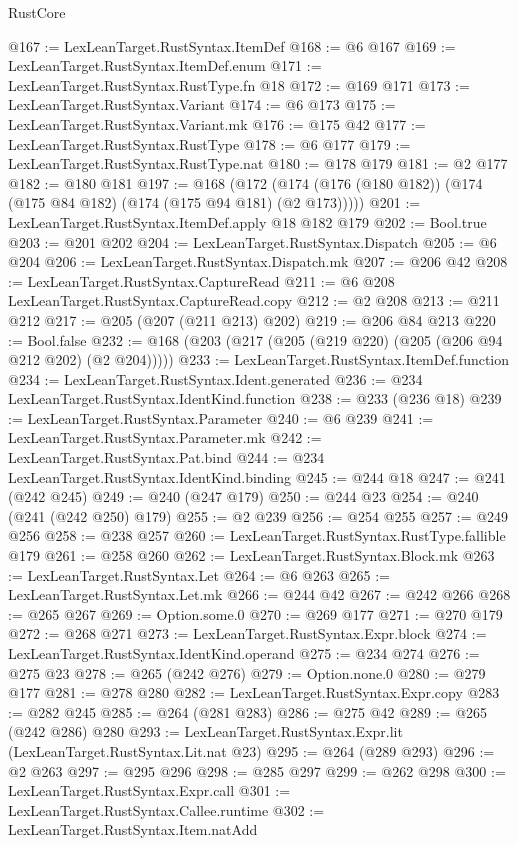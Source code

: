 \begin{lexlean}{RustCore}
\begin{coremodule}
@167 := LexLeanTarget.RustSyntax.ItemDef
@168 := @6 @167
@169 := LexLeanTarget.RustSyntax.ItemDef.enum
@171 := LexLeanTarget.RustSyntax.RustType.fn @18
@172 := @169 @171
@173 := LexLeanTarget.RustSyntax.Variant
@174 := @6 @173
@175 := LexLeanTarget.RustSyntax.Variant.mk
@176 := @175 @42
@177 := LexLeanTarget.RustSyntax.RustType
@178 := @6 @177
@179 := LexLeanTarget.RustSyntax.RustType.nat
@180 := @178 @179
@181 := @2 @177
@182 := @180 @181
@197 := @168
    (@172 (@174 (@176 (@180 @182)) (@174 (@175 @84 @182) (@174 (@175 @94 @181) (@2 @173)))))
@201 := LexLeanTarget.RustSyntax.ItemDef.apply @18 @182 @179
@202 := Bool.true
@203 := @201 @202
@204 := LexLeanTarget.RustSyntax.Dispatch
@205 := @6 @204
@206 := LexLeanTarget.RustSyntax.Dispatch.mk
@207 := @206 @42
@208 := LexLeanTarget.RustSyntax.CaptureRead
@211 := @6 @208 LexLeanTarget.RustSyntax.CaptureRead.copy
@212 := @2 @208
@213 := @211 @212
@217 := @205 (@207 (@211 @213) @202)
@219 := @206 @84 @213
@220 := Bool.false
@232 := @168 (@203 (@217 (@205 (@219 @220) (@205 (@206 @94 @212 @202) (@2 @204)))))
@233 := LexLeanTarget.RustSyntax.ItemDef.function
@234 := LexLeanTarget.RustSyntax.Ident.generated
@236 := @234 LexLeanTarget.RustSyntax.IdentKind.function
@238 := @233 (@236 @18)
@239 := LexLeanTarget.RustSyntax.Parameter
@240 := @6 @239
@241 := LexLeanTarget.RustSyntax.Parameter.mk
@242 := LexLeanTarget.RustSyntax.Pat.bind
@244 := @234 LexLeanTarget.RustSyntax.IdentKind.binding
@245 := @244 @18
@247 := @241 (@242 @245)
@249 := @240 (@247 @179)
@250 := @244 @23
@254 := @240 (@241 (@242 @250) @179)
@255 := @2 @239
@256 := @254 @255
@257 := @249 @256
@258 := @238 @257
@260 := LexLeanTarget.RustSyntax.RustType.fallible @179
@261 := @258 @260
@262 := LexLeanTarget.RustSyntax.Block.mk
@263 := LexLeanTarget.RustSyntax.Let
@264 := @6 @263
@265 := LexLeanTarget.RustSyntax.Let.mk
@266 := @244 @42
@267 := @242 @266
@268 := @265 @267
@269 := Option.some.{0}
@270 := @269 @177
@271 := @270 @179
@272 := @268 @271
@273 := LexLeanTarget.RustSyntax.Expr.block
@274 := LexLeanTarget.RustSyntax.IdentKind.operand
@275 := @234 @274
@276 := @275 @23
@278 := @265 (@242 @276)
@279 := Option.none.{0}
@280 := @279 @177
@281 := @278 @280
@282 := LexLeanTarget.RustSyntax.Expr.copy
@283 := @282 @245
@285 := @264 (@281 @283)
@286 := @275 @42
@289 := @265 (@242 @286) @280
@293 := LexLeanTarget.RustSyntax.Expr.lit (LexLeanTarget.RustSyntax.Lit.nat @23)
@295 := @264 (@289 @293)
@296 := @2 @263
@297 := @295 @296
@298 := @285 @297
@299 := @262 @298
@300 := LexLeanTarget.RustSyntax.Expr.call
@301 := LexLeanTarget.RustSyntax.Callee.runtime
@302 := LexLeanTarget.RustSyntax.Item.natAdd

\end{coremodule}
\end{lexlean}

